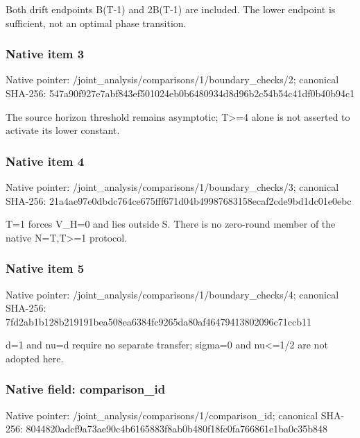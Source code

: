 \documentclass[10pt,a4paper]{article}
\begin{document}
\begingroup\raggedright\sloppy Both drift endpoints B(T-1) and 2B(T-1) are included. The lower endpoint is sufficient,\allowbreak{} not an optimal phase transition.\par\endgroup

\subsubsection{Native item 3}
Native pointer: /joint\_\allowbreak{}analysis/comparisons/1/boundary\_\allowbreak{}checks/2; canonical SHA-256: 547a90f927e7abf843ef501024eb0b6480934d8d96b2c54b54c41df0b40b94c1

\begingroup\raggedright\sloppy The source horizon threshold remains asymptotic;\allowbreak{} T>=\allowbreak{}4 alone is not asserted to activate its lower constant.\par\endgroup

\subsubsection{Native item 4}
Native pointer: /joint\_\allowbreak{}analysis/comparisons/1/boundary\_\allowbreak{}checks/3; canonical SHA-256: 21a4ae97e0dbdc764ce675fff671d04b49987683158ecaf2cde9bd1dc01e0ebc

\begingroup\raggedright\sloppy T=\allowbreak{}1 forces V\_\allowbreak{}H=\allowbreak{}0 and lies outside S. There is no zero-round member of the native N=\allowbreak{}T,\allowbreak{}T>=\allowbreak{}1 protocol.\par\endgroup

\subsubsection{Native item 5}
Native pointer: /joint\_\allowbreak{}analysis/comparisons/1/boundary\_\allowbreak{}checks/4; canonical SHA-256: 7fd2ab1b128b219191bea508ea6384fc9265da80af46479413802096c71ccb11

\begingroup\raggedright\sloppy d=\allowbreak{}1 and nu=\allowbreak{}d require no separate transfer;\allowbreak{} sigma=\allowbreak{}0 and nu<=\allowbreak{}1/\allowbreak{}2 are not adopted here.\par\endgroup

\subsubsection{Native field: comparison\_\allowbreak{}id}
Native pointer: /joint\_\allowbreak{}analysis/comparisons/1/comparison\_\allowbreak{}id; canonical SHA-256: 8044820adcf9a73ae90c4b6165883f8ab0b480f18fc0fa766861e1ba0c35b848
\end{document}
